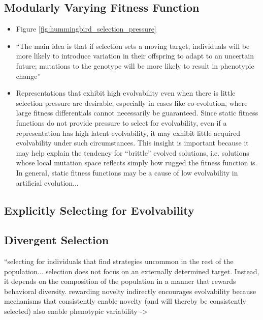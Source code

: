 \subsection{Modularly Varying Fitness Function} \label{sec:mvff}
  \begin{itemize}
    \item Figure \ref{fig:hummingbird_selection_pressure}
    \item ``The main idea is that if selection sets a moving target, individuals will be more likely to introduce variation in their offspring to adapt to an uncertain future; mutations to the genotype will be more likely to result in phenotypic change'' \cite{Wilder2015ReconcilingEvolvability}
    \item \begin{displayquote}
    Representations that exhibit high evolvability even when there is little selection pressure are desirable, especially in cases like co-evolution, where large fitness differentials cannot necessarily be guaranteed. Since  static  fitness  functions  do  not  provide  pressure  to select for evolvability, even if a representation has high latent evolvability, it may exhibit little acquired evolvability under  such  circumstances.   This  insight  is  important  because it may help explain the tendency for “brittle” evolved solutions, i.e. solutions whose local mutation space reflects simply how rugged the fitness function is.  In general, static fitness functions may be a cause of low evolvability in artificial evolution... \cite{Reisinger2006SelectingRepresentations}
      \end{displayquote}
  \end{itemize}
  
\subsection{Explicitly Selecting for Evolvability} \cite{Mengistu2016EvolvabilityIt}

\subsection{Divergent Selection} \label{sec:divergent_selection}
``selecting for individuals that find strategies uncommon in the rest of the population... selection does not focus on an externally determined target. Instead, it depends on the composition of the population in a manner that rewards behavioral diversity. \cite{Wilder2015ReconcilingEvolvability}
   rewarding novelty indirectly encourages evolvability because mechanisms that consistently enable novelty (and will thereby be consistently selected) also enable phenotypic variability \cite{Mengistu2016EvolvabilityIt} -> \cite{Lehman2011ImprovingSelf-Adaptation}


  

